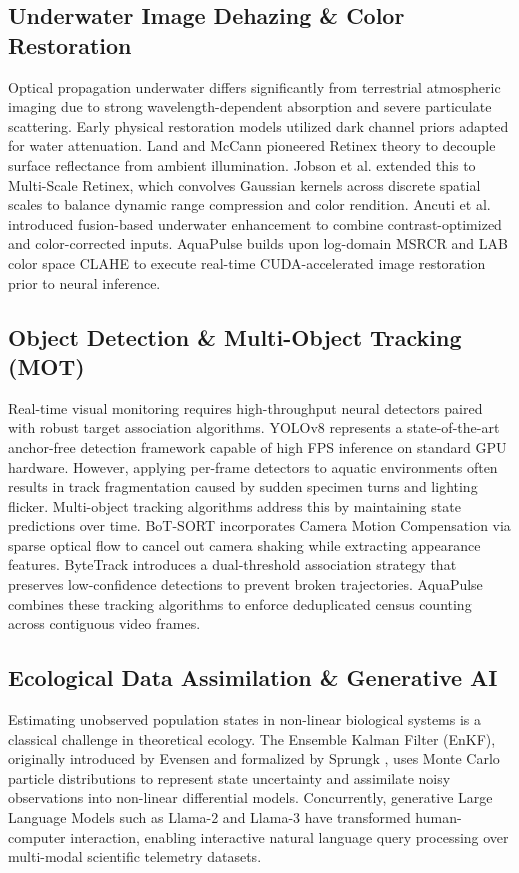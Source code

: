 \documentclass[11pt,a4paper]{article}
\newcommand{\citeblue}[1]{{\color{linkblue}\cite{#1}}}
\begin{document}
\subsection{Underwater Image Dehazing \& Color Restoration}
Optical propagation underwater differs significantly from terrestrial atmospheric imaging due to strong wavelength-dependent absorption and severe particulate scattering. Early physical restoration models utilized dark channel priors adapted for water attenuation. Land and McCann \citeblue{land1971lightness} pioneered Retinex theory to decouple surface reflectance from ambient illumination. Jobson et al. \citeblue{jobson1997multiscale} extended this to Multi-Scale Retinex, which convolves Gaussian kernels across discrete spatial scales to balance dynamic range compression and color rendition. Ancuti et al. \citeblue{ancuti2012enhancing} introduced fusion-based underwater enhancement to combine contrast-optimized and color-corrected inputs. AquaPulse builds upon log-domain MSRCR and LAB color space CLAHE to execute real-time CUDA-accelerated image restoration prior to neural inference.

\subsection{Object Detection \& Multi-Object Tracking (MOT)}
Real-time visual monitoring requires high-throughput neural detectors paired with robust target association algorithms. YOLOv8 \citeblue{jocher2023ultralytics} represents a state-of-the-art anchor-free detection framework capable of high FPS inference on standard GPU hardware. However, applying per-frame detectors to aquatic environments often results in track fragmentation caused by sudden specimen turns and lighting flicker. Multi-object tracking algorithms address this by maintaining state predictions over time. BoT-SORT \citeblue{aharon2022botsort} incorporates Camera Motion Compensation via sparse optical flow to cancel out camera shaking while extracting appearance features. ByteTrack \citeblue{zhang2022bytetrack} introduces a dual-threshold association strategy that preserves low-confidence detections to prevent broken trajectories. AquaPulse combines these tracking algorithms to enforce deduplicated census counting across contiguous video frames.

\subsection{Ecological Data Assimilation \& Generative AI}
Estimating unobserved population states in non-linear biological systems is a classical challenge in theoretical ecology. The Ensemble Kalman Filter (EnKF), originally introduced by Evensen \citeblue{evensen2009data} and formalized by Sprungk \citeblue{sprungk2023}, uses Monte Carlo particle distributions to represent state uncertainty and assimilate noisy observations into non-linear differential models. Concurrently, generative Large Language Models such as Llama-2 and Llama-3 \citeblue{touvron2023llama, dubey2024llama3} have transformed human-computer interaction, enabling interactive natural language query processing over multi-modal scientific telemetry datasets.
\end{document}
